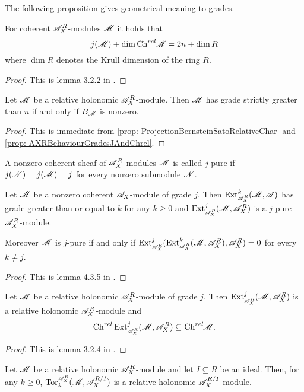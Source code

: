 The following proposition gives geometrical meaning to grades.
\begin{proposition}\label{prop: AXRBehaviourGradesJAndChrel}
  For coherent $\mathscr{A}_X^R$-modules $\mathscr{M}$ it holds that
  $$j(\mathscr{M}) + \dim \operatorname{Ch}^{rel}\mkern-5mu \mathscr{M} = 2n + \dim R $$
  where $\dim R$ denotes the Krull dimension of the ring $R$.
\end{proposition}
\begin{proof}
  This is lemma 3.2.2 in \cite{budur2019zero}.
\end{proof}
\begin{corollary}\label{cor: GradeIFFBernsteinIdeal}
  Let $\mathscr{M}$ be a relative holonomic $\mathscr{A}_X^R$-module. Then $\mathscr{M}$ has grade strictly greater than $n$ if and only if $B_{\mathscr{M}}$ is nonzero.
\end{corollary}
\begin{proof}
  This is immediate from \cref{prop: ProjectionBernsteinSatoRelativeChar} and \cref{prop: AXRBehaviourGradesJAndChrel}.
\end{proof}
\begin{definition}
  A nonzero coherent sheaf of $\mathscr{A}_X^R$-modules $\mathscr{M}$ is called $j$-pure if $j(\mathscr{N})=j(\mathscr{M})=j$ for every nonzero submodule $\mathscr{N}$.
\end{definition}
\begin{lemma}\label{lem: ExtGrade}
  Let $\mathscr{M}$ be a nonzero coherent $\mathscr{A}_X$-module of grade $j$. Then $\Ex{\A_X^R}{k}(\M,\A)$ has grade greater than or equal to $k$ for any $k\geq 0$ and $\Ex{\A_X^R}{j}(\M,\A_X^R)$ is a $j$-pure $\mathscr{A}_X^R$-module.

  Moreover $\mathscr{M}$ is $j$-pure if and only if $\Ex{\A_X^R}{j}(\Ex{\A_X^R}{k}(\M,\A_X^R),\A_X^R)=0$ for every $k\neq j$.
\end{lemma}
\begin{proof}
  This is lemma 4.3.5 in \cite{budur2019zero}.
\end{proof}
\begin{lemma}
  Let $\mathscr{M}$ be a relative holonomic $\mathscr{A}_X^R$-module of grade $j$. Then $\Ex{\A_X^R}{j}(\M,\A_X^R)$ is a relative holonomic $\mathscr{A}_X^R$-module and
  $$\Ch^{rel}\Ex{\A_X^R}{j}(\M,\A_X^R)\subseteq \Chrel \M. $$
\end{lemma}
\begin{proof}
  This is lemma 3.2.4 in \cite{budur2019zero}.
\end{proof}
\begin{lemma}\label{lem: TorRelHol}
  Let $\mathscr{M}$ be a relative holonomic $\mathscr{A}_X^R$-module and let $I\subseteq R$ be an ideal. Then, for any $k\geq 0$, $\Tr{\A_X^R}{k}(\M, \A_X^{R/I})$ is a relative holonomic $\mathscr{A}_X^{R/I}$-module.
 \end{lemma}
